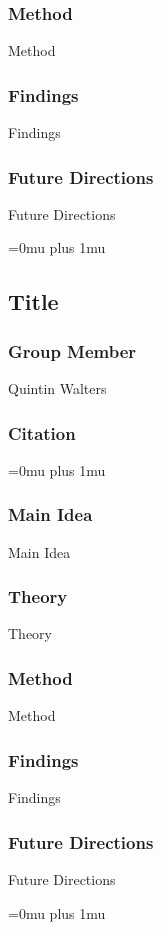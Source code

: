 \subsubsection{Method}

\noindent
Method

\subsubsection{Findings}

\noindent
Findings

\subsubsection{Future Directions}

\noindent
Future Directions 

\Urlmuskip=0mu plus 1mu\relax

\noindent
\subsection{Title}

\subsubsection{Group Member}

\noindent
Quintin Walters

\noindent
\subsubsection{Citation}

\Urlmuskip=0mu plus 1mu\relax

\subsubsection{Main Idea}

\noindent
Main Idea

\subsubsection{Theory}

\noindent
Theory

\subsubsection{Method}

\noindent
Method

\subsubsection{Findings}

\noindent
Findings

\subsubsection{Future Directions}

\noindent
Future Directions 

\Urlmuskip=0mu plus 1mu\relax
\pagebreak
